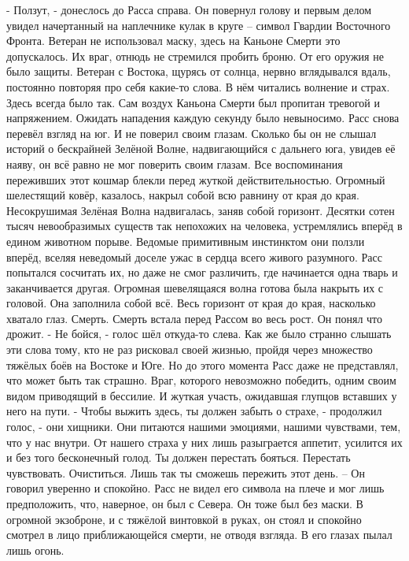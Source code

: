 \documentclass[a4paper, 12pt]{report}
\begin{document}
	- Ползут, - донеслось до Расса справа. Он повернул голову и первым делом увидел начертанный на наплечнике кулак в круге – символ Гвардии Восточного Фронта. Ветеран не использовал маску, здесь на Каньоне Смерти это допускалось. Их враг, отнюдь не стремился пробить броню. От его оружия не было защиты. 
Ветеран  с Востока, щурясь от солнца, нервно вглядывался вдаль, постоянно повторяя про себя какие-то слова. В нём читались волнение и страх. Здесь всегда было так. Сам воздух Каньона Смерти был пропитан тревогой и напряжением. Ожидать нападения каждую секунду было невыносимо. 
Расс снова перевёл взгляд на юг. 
И не поверил своим глазам. Сколько бы он не слышал историй о бескрайней Зелёной Волне, надвигающийся с дальнего юга, увидев её наяву, он всё равно не мог поверить своим глазам. Все воспоминания переживших этот кошмар блекли перед жуткой действительностью.
Огромный шелестящий ковёр, казалось, накрыл собой всю равнину от края до края.
Несокрушимая Зелёная Волна надвигалась, заняв собой горизонт. Десятки сотен тысяч невообразимых существ так непохожих на человека, устремлялись вперёд в едином животном порыве. Ведомые примитивным инстинктом они ползли вперёд, вселяя неведомый доселе ужас в сердца всего живого разумного. Расс попытался сосчитать их, но даже не смог различить, где начинается одна тварь и заканчивается другая. Огромная шевелящаяся волна готова была накрыть их с головой. Она заполнила собой всё. Весь горизонт от края до края, насколько хватало глаз. Смерть. Смерть встала перед Рассом во весь рост.
	Он понял что дрожит.
	- Не бойся, - голос шёл откуда-то слева.
	Как же было странно слышать эти слова тому, кто не раз рисковал своей жизнью, пройдя через множество тяжёлых боёв на Востоке и Юге. Но до этого момента Расс даже не представлял, что может быть так страшно. Враг, которого невозможно победить, одним своим видом приводящий в бессилие. И жуткая участь, ожидавшая глупцов вставших у него на пути.
	- Чтобы выжить здесь, ты должен забыть о страхе, - продолжил голос, - они хищники. Они питаются нашими эмоциями, нашими чувствами, тем, что у нас внутри. От нашего страха у них лишь разыграется аппетит, усилится их и без того бесконечный голод. Ты должен перестать бояться. Перестать чувствовать. Очиститься. Лишь так ты сможешь пережить этот день. –
	  Он говорил уверенно и спокойно. Расс не видел его символа на плече и мог лишь предположить, что, наверное, он был с Севера. Он тоже был без маски. В огромной экзоброне, и с тяжёлой винтовкой в руках, он стоял и спокойно смотрел в лицо приближающейся смерти, не отводя взгляда. В его глазах пылал лишь огонь.
\end{document}
